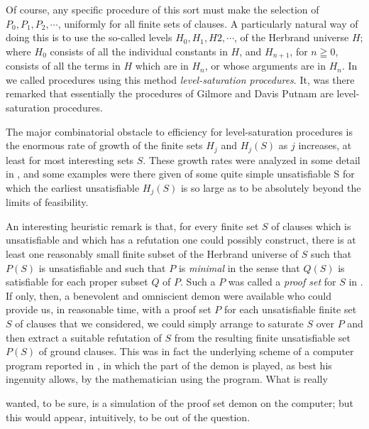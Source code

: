 \documentclass[8pt]{extarticle}
\begin{document}
Of course, any specific procedure of this sort must make the selection of \\$P_0, P_1, P_2,\dotsm$, uniformly for all finite sets of clauses. A  particularly natural way of doing this is to use the so-called levels $H_0, H_1, H2,\dotsm$, of the Herbrand universe $H$; where $H_0$ consists of all the individual constants in $H$, and $H_{n+1}$, for $n\geqq0$, consists of all the terms in $H$ which are in $H_n$, or whose arguments are in $H_n$. In \cite{robinson_1963} we called procedures using this method \emph{level-saturation procedures}. It, was there remarked that essentially the procedures of Gilmore \cite{gilmore_1960} and Davis Putnam \cite{davis_1960} are level-saturation procedures. 

The major combinatorial obstacle to efficiency for level-saturation procedures is the enormous rate of growth of the finite sets $H_j$ and $H_j(S)$ as $j$ increases, at least for most interesting sets $S$. These growth rates were analyzed in some detail in \cite{robinson_1963}, and some examples were there given of some quite simple unsatisfiable S for which the earliest unsatisfiable  $H_j(S)$ is so large as to be absolutely beyond the limits of feasibility.

An interesting heuristic remark is that, for every finite set $S$ of clauses which is unsatisfiable and which has a refutation one could possibly construct, there is at least one reasonably small finite subset of the Herbrand universe of $S$ such that $P(S)$ is unsatisfiable and such that $P$ is \emph{minimal} in the sense that $Q(S)$ is satisfiable for each proper subset $Q$ of $P$. Such a $P$ was called a \emph{proof set} for $S$ in \cite{robinson_1963}. If only, then, a benevolent and omniscient demon were available who could provide us, in reasonable time, with a proof set $P$ for each unsatisfiable finite set $S$ of clauses that we considered, we could simply arrange to saturate $S$ over $P$ and then extract a suitable refutation of $S$ from the resulting finite unsatisfiable set $P(S)$ of ground clauses. This was in fact the underlying scheme of a computer program reported in \cite{robinson_1963}, in which the part of the demon is played, as best his ingenuity allows, by the mathematician using the program. What is really

\newpage

wanted, to be sure, is a simulation of the proof set demon on the computer; but this would appear, intuitively, to be out of the question. 
\end{document}
